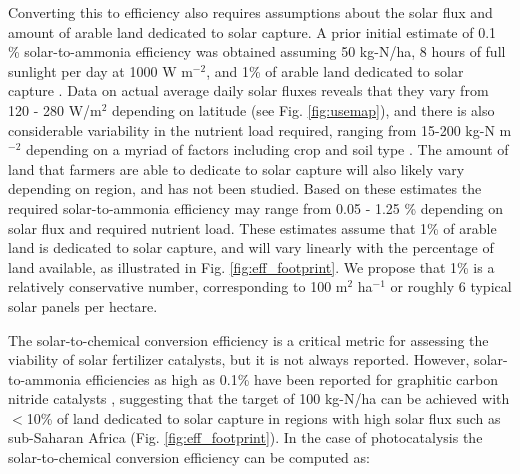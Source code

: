 Converting this to efficiency also requires assumptions about the solar flux and amount of arable land dedicated to solar capture. A prior initial estimate of 0.1 \% solar-to-ammonia efficiency was obtained assuming 50 kg-N/ha, 8 hours of full sunlight per day at 1000 W m$^{-2}$, and 1\% of arable land dedicated to solar capture \cite{Medford_2017}. Data on actual average daily solar fluxes reveals that they vary from 120 - 280 W/m$^2$ depending on latitude \cite{MacKay_2013} (see Fig. \ref{fig:usemap}), and there is also considerable variability in the nutrient load required, ranging from 15-200 kg-N m$^{-2}$ depending on a myriad of factors including crop and soil type \cite{FAOSTAT_2018}. The amount of land that farmers are able to dedicate to solar capture will also likely vary depending on region, and has not been studied. Based on these estimates the required solar-to-ammonia efficiency may range from 0.05 - 1.25 \% depending on solar flux and required nutrient load. These estimates assume that 1\% of arable land is dedicated to solar capture, and will vary linearly with the percentage of land available, as illustrated in Fig. \ref{fig:eff_footprint}. We propose that 1\% is a relatively conservative number, corresponding to 100 m$^2$ ha$^{-1}$ or roughly 6 typical solar panels per hectare.

The solar-to-chemical conversion efficiency is a critical metric for assessing the viability of solar fertilizer catalysts, but it is not always reported. However, solar-to-ammonia efficiencies as high as 0.1\% have been reported for graphitic carbon nitride catalysts \cite{Shiraishi_2018}, suggesting that the target of 100 kg-N/ha can be achieved with $<$10\% of land dedicated to solar capture in regions with high solar flux such as sub-Saharan Africa (Fig. \ref{fig:eff_footprint}). In the case of photocatalysis the solar-to-chemical conversion efficiency can be computed as:

